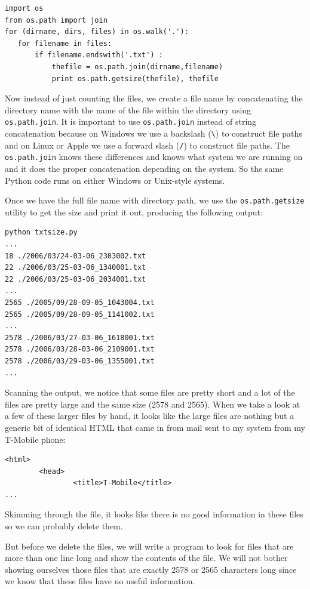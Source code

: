\documentclass[11pt]{book}
\begin{document}
\beforeverb
\begin{verbatim}
import os
from os.path import join
for (dirname, dirs, files) in os.walk('.'):
   for filename in files:
       if filename.endswith('.txt') :
           thefile = os.path.join(dirname,filename)
           print os.path.getsize(thefile), thefile
\end{verbatim}
\afterverb
%
Now instead of just counting the files, we create 
a file name by concatenating the directory name with
the name of the file within the directory using
{\tt os.path.join}.   It is important to use 
{\tt os.path.join} instead of string concatenation 
because on Windows we use a backslash
(\verb"\") to construct file paths and on Linux
or Apple we use a forward slash (\verb"/") 
to construct file paths.  The {\tt os.path.join}
knows these differences and knows what system
we are running on and it does the proper concatenation
depending on the system.  So the same Python code
runs on either Windows or Unix-style systems.

Once we have the full file name with directory
path, we use the {\tt os.path.getsize} utility
to get the size and print it out, producing the 
following output:

\beforeverb
\begin{verbatim}
python txtsize.py
...
18 ./2006/03/24-03-06_2303002.txt
22 ./2006/03/25-03-06_1340001.txt
22 ./2006/03/25-03-06_2034001.txt
...
2565 ./2005/09/28-09-05_1043004.txt
2565 ./2005/09/28-09-05_1141002.txt
...
2578 ./2006/03/27-03-06_1618001.txt
2578 ./2006/03/28-03-06_2109001.txt
2578 ./2006/03/29-03-06_1355001.txt
...
\end{verbatim}
\afterverb
%
Scanning the output, we notice that some files are pretty short and 
a lot of the files are pretty large and the same size (2578 and 2565). 
When we take a look at a few of these larger files by hand, 
it looks like the large 
files are nothing but a generic bit of identical HTML that came 
in from mail sent to my system from my T-Mobile phone:

\beforeverb
\begin{verbatim}
<html>
        <head>
                <title>T-Mobile</title>
...
\end{verbatim}
\afterverb
%
Skimming through the file, it looks like there is no good information
in these files so we can probably delete them.

But before we delete the files, we will write a program to look for files
that are more than one line long and show the contents of the file.
We will not bother showing ourselves those files that are exactly
2578 or 2565 characters long since we know that these files have no useful
information.
\end{document}
